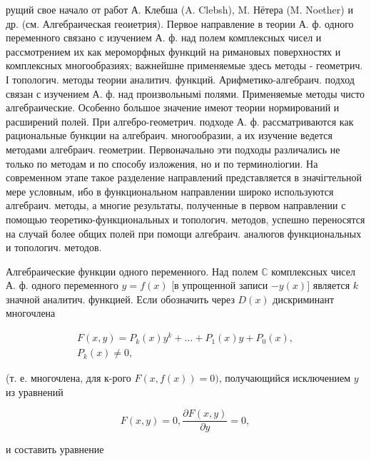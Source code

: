 \documentclass[10pt]{article}
\begin{document}
рущий свое начало от работ А. Клебша (A. Clebsh), M. Нётера (M. Noether) и др. (см. Алгебраическая геоиетрия). Первое направление в теории А. ф. одного переменного связано с изучением А. ф. над полем комплексных чисел и рассмотрением их как мероморфных функций на римановых поверхностях и комплексных многообразиях; важнейшне применяемые здесь методы - геометрич. І топологич. методы теории аналитич. функций. Арифметико-алгебраич. подход связан с изучением А. ф. над произвольнымі полями. Применяемые методы чисто алгебраические. Особенно большое значение имеют теории нормирований и расширений полей. При алгебро-геометрич. подходе А. ф. рассматриваются как рациональные бункции на алгебраич. многообразии, а их изучение ведется методами алгебраич. геометрии. Первоначально эти подходы различались не только по методам и по способу изложения, но и по терминоліогии. На современном этапе такое разделение направлений представляется в значігтельной мере условным, ибо в функциональном направлении широко используются алгебраич. методы, а многие результаты, полученные в первом направлении с помощью теоретико-функциональных и топологич. методов, успешно переносятся на случай более общих полей при помощи алгебраич. аналюгов функциональных и топологич. методов.



Алгебраические функции одного переменного. Над полем $\mathbb{C}$ комплексных чисел А. ф. одного переменного $y=f(x)$ [в упрощенной записи $-y(x)]$ является $k$ значной аналитич. функцией. Если обозначить через $D(x)$ дискриминант многочлена



\[

\begin{gathered}

F(x, y)=P_{k}(x) y^{k}+\ldots+P_{1}(x) y+P_{0}(x), \\

P_{k}(x) \neq 0,

\end{gathered}

\]



(т. е. многочлена, для к-рого $F(x, f(x))=0)$, получающийся исключением $y$ из уравнений



\[

F(x, y)=0, \frac{\partial F(x, y)}{\partial y}=0,

\]



и составить уравнение
\end{document}
